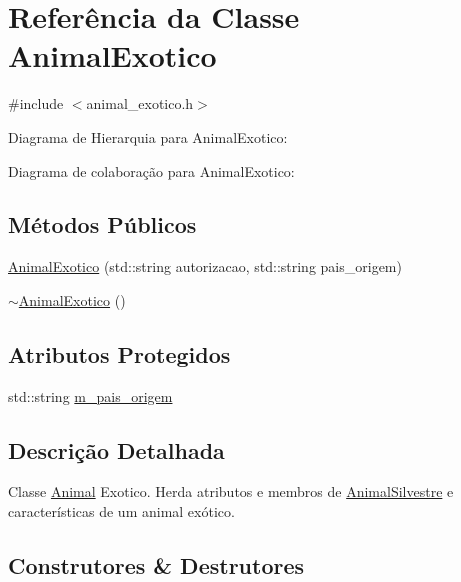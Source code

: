 \hypertarget{classAnimalExotico}{}\section{Referência da Classe Animal\+Exotico}
\label{classAnimalExotico}


{\ttfamily \#include $<$animal\+\_\+exotico.\+h$>$}



Diagrama de Hierarquia para Animal\+Exotico\+:


Diagrama de colaboração para Animal\+Exotico\+:
\subsection*{Métodos Públicos}
\begin{DoxyCompactItemize}
\item 
\hyperlink{classAnimalExotico_a85f92e61d4f5475d84d574653cd4a178}{Animal\+Exotico} (std\+::string autorizacao, std\+::string pais\+\_\+origem)
\item 
\hyperlink{classAnimalExotico_a3bce432a5e14f93e6d5254ce86075d36}{$\sim$\+Animal\+Exotico} ()
\end{DoxyCompactItemize}
\subsection*{Atributos Protegidos}
\begin{DoxyCompactItemize}
\item 
std\+::string \hyperlink{classAnimalExotico_a5a00f07c9cd9f11baadef0282eaad031}{m\+\_\+pais\+\_\+origem}
\end{DoxyCompactItemize}


\subsection{Descrição Detalhada}
Classe \hyperlink{classAnimal}{Animal} Exotico. Herda atributos e membros de \hyperlink{classAnimalSilvestre}{Animal\+Silvestre} e características de um animal exótico. 

\subsection{Construtores \& Destrutores}
\mbox{\label{classAnimalExotico_a85f92e61d4f5475d84d574653cd4a178}} 
